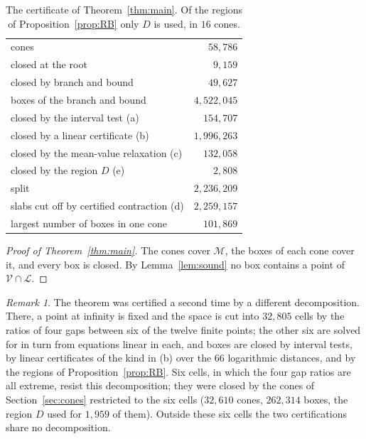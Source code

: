 \documentclass[11pt,a4paper]{article}
\theoremstyle{definition}
\theoremstyle{remark}
\newtheorem{remark}[theorem]{Remark}
\newcommand{\Mo}{\mathcal{M}}
\newcommand{\V}{\mathcal{V}}
\newcommand{\Lam}{\mathcal{L}}
\begin{document}
\begin{table}[h]
\centering\small
\begin{tabular}{@{}lr@{}}
\toprule
cones & $58{,}786$ \\
\quad closed at the root & $9{,}159$ \\
\quad closed by branch and bound & $49{,}627$ \\
boxes of the branch and bound & $4{,}522{,}045$ \\
\quad closed by the interval test (a) & $154{,}707$ \\
\quad closed by a linear certificate (b) & $1{,}996{,}263$ \\
\quad closed by the mean-value relaxation (c) & $132{,}058$ \\
\quad closed by the region $D$ (e) & $2{,}808$ \\
\quad split & $2{,}236{,}209$ \\
slabs cut off by certified contraction (d) & $2{,}259{,}157$ \\
largest number of boxes in one cone & $101{,}869$ \\
\bottomrule
\end{tabular}
\caption{The certificate of Theorem~\ref{thm:main}. Of the regions of Proposition~\ref{prop:RB} only $D$
is used, in $16$ cones.}
\label{tab:run}
\end{table}

\begin{proof}[Proof of Theorem~\ref{thm:main}]
The cones cover $\Mo$, the boxes of each cone cover it, and every box is closed. By
Lemma~\ref{lem:sound} no box contains a point of $\V \cap \Lam$.
\end{proof}

\begin{remark}
The theorem was certified a second time by a different decomposition. There, a point at infinity is
fixed and the space is cut into $32{,}805$ cells by the ratios of four gaps between six of the twelve
finite points; the other six are solved for in turn from equations linear in each, and boxes are closed by interval tests, by
linear certificates of the kind in (b) over the $66$ logarithmic distances, and by the regions of
Proposition~\ref{prop:RB}. Six cells, in which the four gap ratios are all extreme, resist this decomposition; they were closed by
the cones of Section~\ref{sec:cones} restricted to the six cells ($32{,}610$ cones, $262{,}314$ boxes,
the region $D$ used for $1{,}959$ of them). Outside these six cells the two certifications share no
decomposition.
\end{remark}
\end{document}
